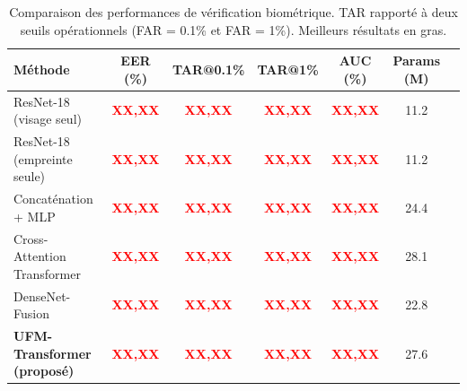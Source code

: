 \documentclass[12pt,a4paper]{report}
\begin{document}
\begin{table}[htbp]
    \centering
    \caption{Comparaison des performances de v\'{e}rification biom\'{e}trique. TAR rapport\'{e} \`{a} deux seuils op\'{e}rationnels (FAR = 0.1\% et FAR = 1\%). Meilleurs r\'{e}sultats en gras.}
    \label{tab:resultats-principaux}
    \begin{tabular}{lcccccc}
        \hline
        \hline
        \textbf{M\'{e}thode} & \textbf{EER (\%)} & \textbf{TAR@0.1\%} & \textbf{TAR@1\%} & \textbf{AUC (\%)} & \textbf{Params (M)} \\
        \hline
        ResNet-18 (visage seul) & \textcolor{red}{\textbf{XX,XX}} & \textcolor{red}{\textbf{XX,XX}} & \textcolor{red}{\textbf{XX,XX}} & \textcolor{red}{\textbf{XX,XX}} & 11.2 \\
        ResNet-18 (empreinte seule) & \textcolor{red}{\textbf{XX,XX}} & \textcolor{red}{\textbf{XX,XX}} & \textcolor{red}{\textbf{XX,XX}} & \textcolor{red}{\textbf{XX,XX}} & 11.2 \\
        Concat\'{e}nation + MLP & \textcolor{red}{\textbf{XX,XX}} & \textcolor{red}{\textbf{XX,XX}} & \textcolor{red}{\textbf{XX,XX}} & \textcolor{red}{\textbf{XX,XX}} & 24.4 \\
        Cross-Attention Transformer & \textcolor{red}{\textbf{XX,XX}} & \textcolor{red}{\textbf{XX,XX}} & \textcolor{red}{\textbf{XX,XX}} & \textcolor{red}{\textbf{XX,XX}} & 28.1 \\
        DenseNet-Fusion \cite{huang2017densely} & \textcolor{red}{\textbf{XX,XX}} & \textcolor{red}{\textbf{XX,XX}} & \textcolor{red}{\textbf{XX,XX}} & \textcolor{red}{\textbf{XX,XX}} & 22.8 \\
        \rowcolor{gray!15}
        \textbf{UFM-Transformer (propos\'{e})} & \textcolor{red}{\textbf{XX,XX}} & \textcolor{red}{\textbf{XX,XX}} & \textcolor{red}{\textbf{XX,XX}} & \textcolor{red}{\textbf{XX,XX}} & 27.6 \\
        \hline
        \hline
    \end{tabular}
\end{table}

\end{document}
